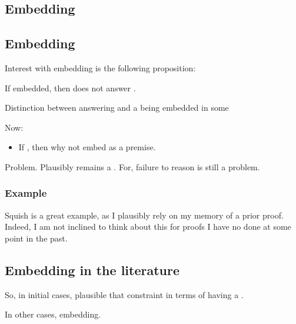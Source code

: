 \subsection{Embedding }
\label{cha:var:ros:Emb}



\subsection{Embedding }
\label{sec:wrangling}

\begin{note}
  Interest with embedding is the following proposition:

  \begin{proposition}
    If embedded, then does not answer \qWhyV{}.
  \end{proposition}

  Distinction between \ros{} answering \qWhyV{} and a \ros{} being embedded in some \ros{}

  Now:
  \begin{itemize}
  \item
    If \requ{}, then why not embed \fc{} as a premise.
  \end{itemize}
\end{note}

\begin{note}
  Problem.
  Plausibly remains a \requ{}.
  For, failure to reason is still a problem.
\end{note}

\subsubsection{Example}
\label{sec:example}

\begin{note}
  Squish is a great example, as I plausibly rely on my memory of a prior proof.
  Indeed, I am not inclined to think about this for proofs I have no done at some point in the past.
\end{note}

\subsection{Embedding in the literature}
\label{cha:var:sec:embedding}

\begin{note}
  So, in initial cases, plausible that constraint in terms of having a \wit{}.

  In other cases, embedding.
\end{note}

